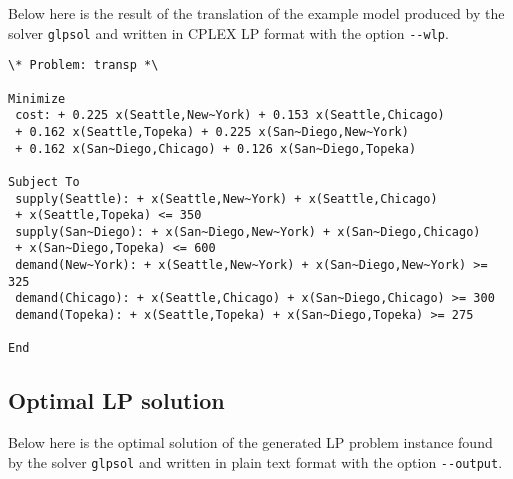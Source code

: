 \documentclass[10pt]{article}
\begin{document}
Below here is the result of the translation of the example model
produced by the solver \verb|glpsol| and written in CPLEX LP format
with the option \verb|--wlp|.

\begin{small}
\begin{verbatim}
\* Problem: transp *\

Minimize
 cost: + 0.225 x(Seattle,New~York) + 0.153 x(Seattle,Chicago)
 + 0.162 x(Seattle,Topeka) + 0.225 x(San~Diego,New~York)
 + 0.162 x(San~Diego,Chicago) + 0.126 x(San~Diego,Topeka)

Subject To
 supply(Seattle): + x(Seattle,New~York) + x(Seattle,Chicago)
 + x(Seattle,Topeka) <= 350
 supply(San~Diego): + x(San~Diego,New~York) + x(San~Diego,Chicago)
 + x(San~Diego,Topeka) <= 600
 demand(New~York): + x(Seattle,New~York) + x(San~Diego,New~York) >= 325
 demand(Chicago): + x(Seattle,Chicago) + x(San~Diego,Chicago) >= 300
 demand(Topeka): + x(Seattle,Topeka) + x(San~Diego,Topeka) >= 275

End
\end{verbatim}
\end{small}

\subsection{Optimal LP solution}

Below here is the optimal solution of the generated LP problem instance
found by the solver \verb|glpsol| and written in plain text format
with the option \verb|--output|.

\newpage
\end{document}

